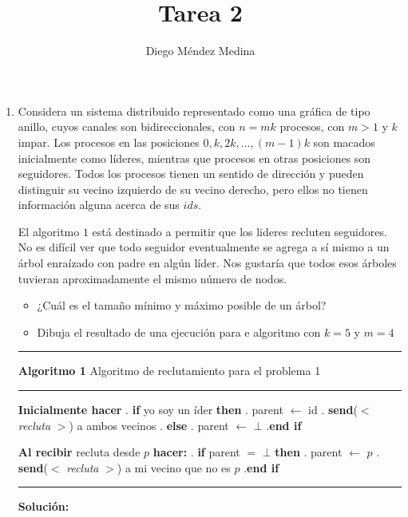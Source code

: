 \documentclass[8pt, letterpaper]{article}
\title{%
  Tarea 2\\
  {\large{}}}
\author{Diego Méndez Medina}
\date{}
\begin{document}
\ttfamily
\maketitle
\rmfamily
\begin{enumerate}
\item Considera un sistema distribuido representado como una gráfica de tipo
  anillo, cuyos canales son bidireccionales, con $n = mk$ procesos, con $m >1$
  y $k$ impar. Los procesos en las posiciones $0, k, 2k, ..., (m-1)k$ son
  macados inicialmente como líderes, mientras que procesos en otras posiciones
  son seguidores. Todos los procesos tienen un sentido de dirección y pueden
  distinguir su vecino izquierdo de su vecino derecho, pero ellos no tienen
  información alguna acerca de sus $ids$.

  El algoritmo $1$ está destinado a permitir que los lideres recluten
  seguidores. No es difícil ver que todo seguidor eventualmente se agrega a sí
  mismo a un árbol enraízado con padre en algún líder. Nos gustaría que todos
  esos árboles tuvieran aproximadamente el mismo número de nodos.
  \begin{itemize}
  \item ¿Cuál es el tamaño mínimo y máximo posible de un árbol?
  \item Dibuja el resultado de una ejecución para e algoritmo con $k = 5$ y
    $m = 4$
  \end{itemize}
  \rule{1\textwidth}{0.2mm}
  {\bf Algoritmo 1} Algoritmo de reclutamiento para el problema 1
  \hfill\break
  \rule{1\textwidth}{0.2mm}
  \hspace*{.2cm} {\bf Inicialmente hacer}
  \hfill{}. {\bf if} yo soy un íder {\bf then}
  \hfill{}. \hspace{0.5cm} parent $\leftarrow$ id
  \hfill{}. \hspace{0.5cm} {\bf send}($<$ \textit{recluta} $>$) a ambos vecinos
  \hfill{}. {\bf else}
  \hfill{}. \hspace{0.5cm} parent $\leftarrow$ $\bot$
  \hfill{}.{\bf end if}
  
  \hspace{0.2cm} {\bf Al recibir} recluta desde $p$ {\bf hacer:}
  \hfill{}. {\bf if} parent $=$ $\bot$ {\bf then}
  \hfill{}. \hspace{0.5cm} parent $\leftarrow$ $p$
  \hfill{}. \hspace{0.5cm} {\bf send}($<$ \textit{recluta} $>$) a mi vecino que
  no es $p$
  \hfill{}.{\bf end if}
  \hfill\break
  \rule{1\textwidth}{0.2mm}
  \hfill\break
  \ttfamily
  {\bf Solución:}
  

\end{enumerate}
\end{document}
